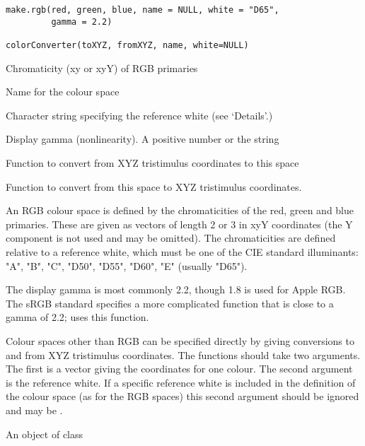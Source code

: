 \begin{Usage}
\begin{verbatim}
make.rgb(red, green, blue, name = NULL, white = "D65",
         gamma = 2.2)

colorConverter(toXYZ, fromXYZ, name, white=NULL)
\end{verbatim}
\end{Usage}
%
\begin{Arguments}
\begin{ldescription}
\item[\code{red,green,blue}] Chromaticity (xy or xyY) of RGB primaries
\item[\code{name}] Name for the colour space
\item[\code{white}] Character string specifying the reference white (see
`Details'.)
\item[\code{gamma}] Display gamma (nonlinearity). A positive number or the
string  
\item[\code{fromXYZ}] Function to convert from XYZ tristimulus coordinates
to this space
\item[\code{toXYZ}] Function to convert from this space to XYZ tristimulus
coordinates.
\end{ldescription}
\end{Arguments}
%
\begin{Details}\relax
An RGB colour space is defined by the chromaticities of the  red, green and
blue primaries.  These are given as vectors of length 2 or 3 in xyY
coordinates (the Y component is not used and may be omitted).
The chromaticities are defined relative to a reference white, which
must be one of the CIE standard illuminants: "A", "B", "C",
"D50", "D55", "D60", "E" (usually "D65").

The display gamma is most commonly 2.2, though 1.8 is used for Apple RGB.
The sRGB standard specifies a more complicated function that is close
to a gamma of 2.2;  uses this function.

Colour spaces other than RGB can be specified directly by giving
conversions to and from XYZ tristimulus coordinates.
The functions  should take two arguments. The first is a vector giving the
coordinates for one colour. The second argument is the reference
white. If a specific reference white is included in the definition of
the colour space (as for the RGB spaces) this second argument should
be ignored and may be .
\end{Details}
%
\begin{Value}
An object of class 
\end{Value}
